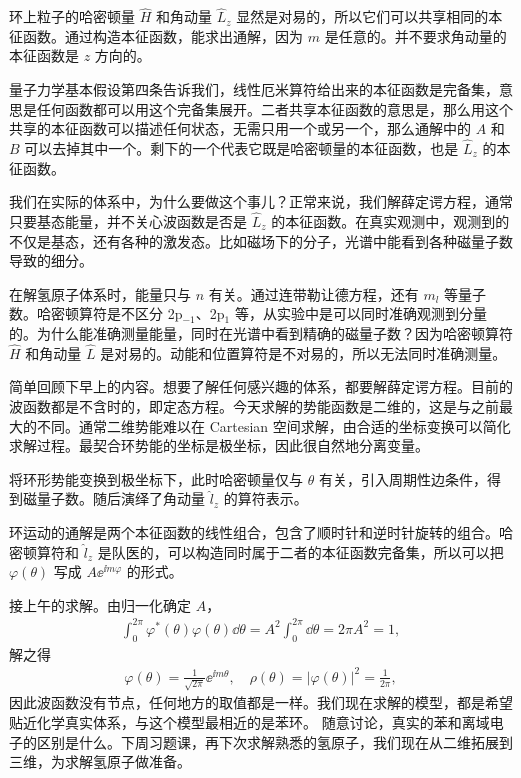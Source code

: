 环上粒子的哈密顿量 $\hat H$ 和角动量 $\hat L_z$ 显然是对易的，所以它们可以共享相同的本征函数。通过构造本征函数，能求出通解，因为 $m$ 是任意的。并不要求角动量的本征函数是 $z$ 方向的。

量子力学基本假设第四条告诉我们，线性厄米算符给出来的本征函数是完备集，意思是任何函数都可以用这个完备集展开。二者共享本征函数的意思是，那么用这个共享的本征函数可以描述任何状态，无需只用一个或另一个，那么通解中的 $A$ 和 $B$ 可以去掉其中一个。剩下的一个代表它既是哈密顿量的本征函数，也是 $\hat L_z$ 的本征函数。

我们在实际的体系中，为什么要做这个事儿？正常来说，我们解薛定谔方程，通常只要基态能量，并不关心波函数是否是 $\hat L_z$ 的本征函数。在真实观测中，观测到的不仅是基态，还有各种的激发态。比如磁场下的分子，光谱中能看到各种磁量子数导致的细分。

在解氢原子体系时，能量只与 $n$ 有关。通过连带勒让德方程，还有 $m_l$ 等量子数。哈密顿算符是不区分 2p$_{-1}$、2p$_1$ 等，从实验中是可以同时准确观测到分量的。为什么能准确测量能量，同时在光谱中看到精确的磁量子数？因为哈密顿算符 $\hat H$ 和角动量 $\hat L$ 是对易的。动能和位置算符是不对易的，所以无法同时准确测量。

简单回顾下早上的内容。想要了解任何感兴趣的体系，都要解薛定谔方程。目前的波函数都是不含时的，即定态方程。今天求解的势能函数是二维的，这是与之前最大的不同。通常二维势能难以在 Cartesian 空间求解，由合适的坐标变换可以简化求解过程。最契合环势能的坐标是极坐标，因此很自然地分离变量。

将环形势能变换到极坐标下，此时哈密顿量仅与 $\theta$ 有关，引入周期性边条件，得到磁量子数。随后演绎了角动量 $\hat l_z$ 的算符表示。

环运动的通解是两个本征函数的线性组合，包含了顺时针和逆时针旋转的组合。哈密顿算符和 $\hat l_z$ 是队医的，可以构造同时属于二者的本征函数完备集，所以可以把 $\varphi(\theta)$ 写成 $A \ee^{\ii m \varphi}$ 的形式。

接上午的求解。由归一化确定 $A$，
\begin{align}
    \int_0^{2\pi} \varphi^*(\theta) \varphi(\theta) \dd\theta = A^2 \int_{0}^{2\pi} \dd\theta = 2\pi A^2 = 1,
\end{align}
解之得
\begin{align}
    \varphi(\theta) = \frac{1}{\sqrt{2\pi}} \ee^{\ii m \theta}, \quad \rho(\theta) = |\varphi(\theta)|^2 = \frac1{2\pi},
\end{align}
因此波函数没有节点，任何地方的取值都是一样。我们现在求解的模型，都是希望贴近化学真实体系，与这个模型最相近的是苯环。
随意讨论，真实的苯和离域电子的区别是什么。下周习题课，再下次求解熟悉的氢原子，我们现在从二维拓展到三维，为求解氢原子做准备。


